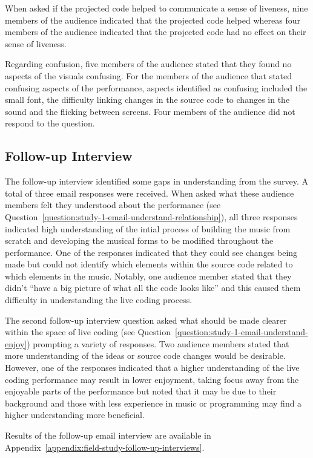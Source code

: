 When asked if the projected code helped to communicate a sense of liveness, nine members of the audience indicated that the projected code helped whereas four members of the audience indicated that the projected code had no effect on their sense of liveness.

Regarding confusion, five members of the audience stated that they found no aspects of the visuals confusing. For the members of the audience that stated confusing aspects of the performance, aspects identified as confusing included the small font, the difficulty linking changes in the source code to changes in the sound and the flicking between screens. Four members of the audience did not respond to the question.

\subsection{Follow-up Interview}

The follow-up interview identified some gaps in understanding from the survey. A total of three email responses were received. When asked what these audience members felt they understood about the performance (see Question~\ref{question:study-1-email-understand-relationship}), all three responses indicated high understanding of the intial process of building the music from scratch and developing the musical forms to be modified throughout the performance. One of the responses indicated that they could see changes being made but could not identify which elements within the source code related to which elements in the music. Notably, one audience member stated that they didn't ``have a big picture of what all the code looks like'' and this caused them difficulty in understanding the live coding process. 

The second follow-up interview question asked what should be made clearer within the space of live coding (see Question~\ref{question:study-1-email-understand-enjoy}) prompting a variety of responses. Two audience members stated that more understanding of the ideas or source code changes would be desirable. However, one of the responses indicated that a higher understanding of the live coding performance may result in lower enjoyment, taking focus away from the enjoyable parts of the performance but noted that it may be due to their background and those with less experience in music or programming may find a higher understanding more beneficial.

Results of the follow-up email interview are available in Appendix~\ref{appendix:field-study-follow-up-interviews}.

